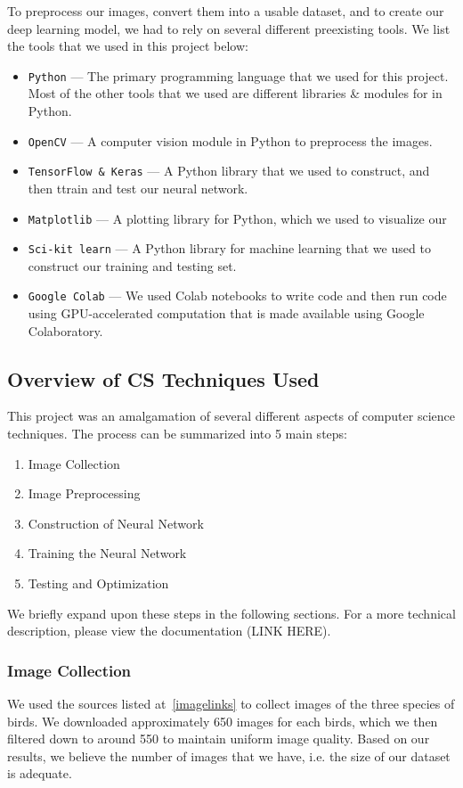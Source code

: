 \documentclass[11pt]{article}
\begin{document}
  To preprocess our images, convert them into a usable dataset, and to create
  our deep learning model, we had to rely on several different preexisting tools.
  We list the tools that we used in this project below:
  \setlength{\parskip}{0em}
  \begin{itemize}
    \item \texttt{Python} --- The primary programming language that we used for this project.
      Most of the other tools that we used are different libraries \& modules for in Python.
    \item \texttt{OpenCV} --- A computer vision module in Python to preprocess the images. 
    \item \texttt{TensorFlow \& Keras} --- A Python library that we used to construct, and then 
      ttrain and test our neural network. 
    \item \texttt{Matplotlib} --- A plotting library for Python, which we used to visualize our
    \item \texttt{Sci-kit learn} --- A Python library for machine learning that we used to 
      construct our training and testing set. 
    \item \texttt{Google Colab} --- We used Colab notebooks to write code and then run code
      using GPU-accelerated computation that is made available using Google Colaboratory.
  \end{itemize}
 
\subsection{Overview of CS Techniques Used}
  This project was an amalgamation of several different aspects of computer science techniques.
  The process can be summarized into 5 main steps:
  \begin{enumerate}
    \item Image Collection
    \item Image Preprocessing 
    \item Construction of Neural Network 
    \item Training the Neural Network
    \item Testing and Optimization
  \end{enumerate}
  
  We briefly expand upon these steps in the following sections. For a more technical 
  description, please view the documentation (LINK HERE). 

  \subsubsection{Image Collection}
  We used the sources listed at~\ref{imagelinks} to collect images of the three species of birds.
  We downloaded approximately 650 images for each birds, which we then filtered
  down to around 550 to maintain uniform image quality. Based on our results, we believe
  the number of images that we have, i.e. the size of our dataset is adequate. 
  
\end{document}
